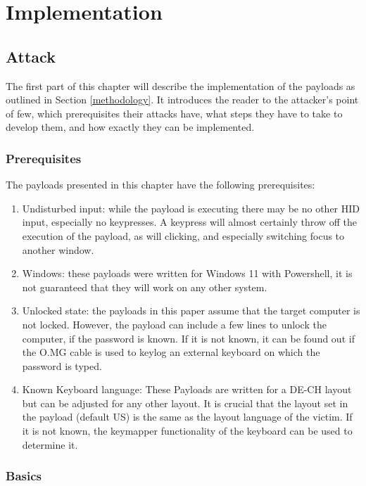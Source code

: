 \chapter{Implementation} \label{Implementation}

\section{Attack}

The first part of this chapter will describe the implementation of the payloads as outlined in Section \ref{methodology}. It introduces the reader to the attacker's point of few, which prerequisites their attacks have, what steps they have to take to develop them, and how exactly they can be implemented. 


\subsection{Prerequisites}

The payloads presented in this chapter have the following prerequisites:
\begin{enumerate}
    \item Undisturbed input: while the payload is executing there may be no other HID input, especially no keypresses. A keypress will almost certainly throw off the execution of the payload, as will clicking, and especially switching focus to another window.
    \item Windows: these payloads were written for Windows 11 with Powershell, it is not guaranteed that they will work on any other system.
    \item Unlocked state: the payloads in this paper assume that the target computer is not locked. However, the payload can include a few lines to unlock the computer, if the password is known. If it is not known, it can be found out if the O.MG cable is used to keylog an external keyboard on which the password is typed. 
    \item Known Keyboard language: These Payloads are written for a DE-CH layout but can be adjusted for any other layout. It is crucial that the layout set in the payload (default US) is the same as the layout language of the victim. If it is not known, the keymapper functionality of the keyboard can be used to determine it. 
\end{enumerate}

\subsection{Basics}

